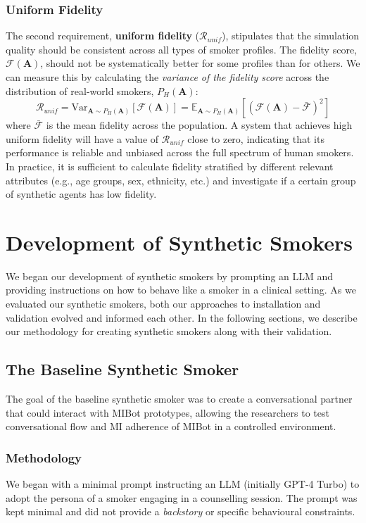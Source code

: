 \subsubsection{Uniform Fidelity}
\label{uniform-fidelity}

The second requirement, \textbf{uniform fidelity} ($\mathcal{R}_{unif}$), stipulates
that the simulation quality should be consistent across all types of smoker profiles.
The fidelity score, $\mathcal{F}(\textbf{A})$, should not be systematically better for
some profiles than for others. We can measure this by calculating the \textit{variance
	of the fidelity score} across the distribution of real-world smokers,
$P_H(\textbf{A})$:
\[\mathcal{R}_{unif} = \text{Var}_{\textbf{A} \sim P_H(\textbf{A})}[\mathcal{F}(\textbf{A})] = \mathbb{E}_{\textbf{A} \sim P_H(\textbf{A})} [(\mathcal{F}(\textbf{A}) - \bar{\mathcal{F}})^2]\]
where $\bar{\mathcal{F}}$ is the mean fidelity across the population. A system that
achieves high uniform fidelity will have a value of $\mathcal{R}_{unif}$ close to zero,
indicating that its performance is reliable and unbiased across the full spectrum of
human smokers. In practice, it is sufficient to calculate fidelity stratified by
different relevant attributes (e.g., age groups, sex, ethnicity, etc.) and investigate
if a certain group of synthetic agents has low fidelity.

\section{Development of Synthetic Smokers}
We began our development of synthetic smokers by prompting an LLM and providing
instructions on how to behave like a smoker in a clinical setting. As we evaluated our
synthetic smokers, both our approaches to installation and validation evolved and
informed each other. In the following sections, we describe our methodology for
creating synthetic smokers along with their validation.

\subsection{The Baseline Synthetic Smoker}
\label{sec:synthetic-smoker-baseline}
The goal of the baseline synthetic smoker was to create a conversational partner that could interact with MIBot prototypes, allowing the researchers to test conversational flow and MI adherence of MIBot in a controlled environment.

\subsubsection{Methodology}
We began with a minimal prompt instructing an LLM (initially GPT-4 Turbo) to adopt the
persona of a smoker engaging in a counselling session. The prompt was kept minimal and
did not provide a \emph{backstory} or specific behavioural constraints.

